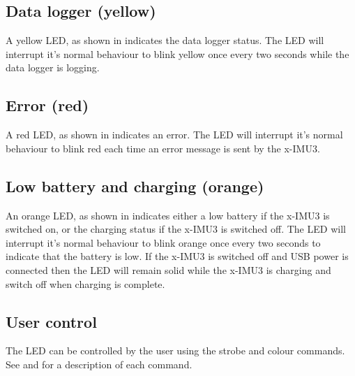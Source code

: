 
\subsection{Data logger (yellow)}

A yellow \ac{LED}, as shown in  indicates the data logger status.  The \ac{LED} will interrupt it's normal behaviour to blink yellow once every two seconds while the data logger is logging.


\subsection{Error (red)}

A red \ac{LED}, as shown in  indicates an error.  The \ac{LED} will interrupt it's normal behaviour to blink red each time an error message is sent by the x-IMU3.


\subsection{Low battery and charging (orange)}

An orange \ac{LED}, as shown in  indicates either a low battery if the x-IMU3 is switched on, or the charging status if the x-IMU3 is switched off.  The \ac{LED} will interrupt it's normal behaviour to blink orange once every two seconds to indicate that the battery is low.  If the x-IMU3 is switched off and USB power is connected then the \ac{LED} will remain solid while the x-IMU3 is charging and switch off when charging is complete.


\subsection{User control}

The \ac{LED} can be controlled by the user using the strobe and colour commands.  See  and  for a description of each command.
